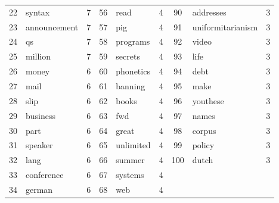 \documentclass[10pt, a4paper]{article}
\begin{document}
\begin{table}[H]
\begin{tabular}{|c|l|c||c|l|c||c|l|c|}
22 & syntax & 7 & 56 & read & 4 & 90 & addresses & 3 \\
23 & announcement & 7 & 57 & pig & 4 & 91 & uniformitarianism & 3 \\
24 & qs & 7 & 58 & programs & 4 & 92 & video & 3 \\
25 & million & 7 & 59 & secrets & 4 & 93 & life & 3 \\
26 & money & 6 & 60 & phonetics & 4 & 94 & debt & 3 \\
27 & mail & 6 & 61 & banning & 4 & 95 & make & 3 \\
28 & slip & 6 & 62 & books & 4 & 96 & youthese & 3 \\
29 & business & 6 & 63 & fwd & 4 & 97 & names & 3 \\
30 & part & 6 & 64 & great & 4 & 98 & corpus & 3 \\
31 & speaker & 6 & 65 & unlimited & 4 & 99 & policy & 3 \\
32 & lang & 6 & 66 & summer & 4 & 100 & dutch & 3 \\
33 & conference & 6 & 67 & systems & 4 &  &  &  \\
34 & german & 6 & 68 & web & 4 &  &  &  \\
\hline
\end{tabular}
\label{table:subjcorpus}
\end{table}
\end{document}
